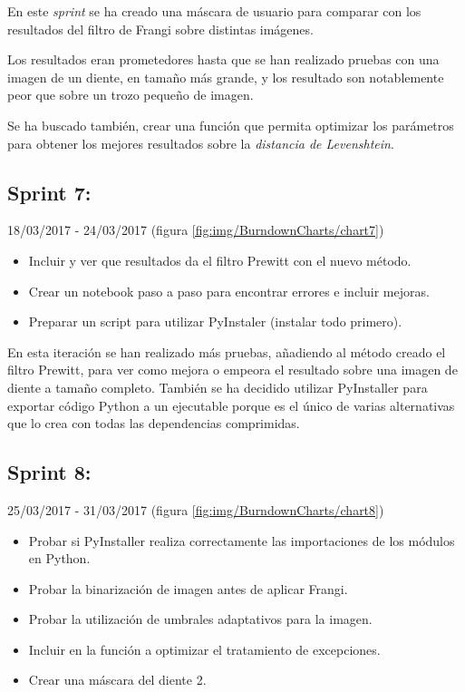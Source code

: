 En este \textit{sprint} se ha creado una máscara de usuario para comparar con los resultados del filtro de Frangi sobre distintas imágenes. 

Los resultados eran prometedores hasta que se han realizado pruebas con una imagen de un diente, en tamaño más grande, y los resultado son notablemente peor que sobre un trozo pequeño de imagen.

Se ha buscado también, crear una función que permita optimizar los parámetros para obtener los mejores resultados sobre la \textit{distancia de Levenshtein}.

\newpage

\subsection{Sprint 7:}
18/03/2017 - 24/03/2017 (figura \ref{fig:img/BurndownCharts/chart7})


\begin{itemize}
    \item Incluir y ver que resultados da el filtro Prewitt con el nuevo método.
    \item Crear un notebook paso a paso para encontrar errores e incluir mejoras.
    \item Preparar un script para utilizar PyInstaler (instalar todo primero).
\end{itemize}

En esta iteración se han realizado más pruebas, añadiendo al método creado el filtro Prewitt, para ver como mejora o empeora el resultado sobre una imagen de diente a tamaño completo. También se ha decidido utilizar PyInstaller para exportar código Python a un ejecutable porque es el único de varias alternativas que lo crea con todas las dependencias comprimidas.

\newpage

\subsection{Sprint 8:}
25/03/2017 - 31/03/2017 (figura \ref{fig:img/BurndownCharts/chart8})


\begin{itemize}
    \item Probar si PyInstaller realiza correctamente las importaciones de los módulos en Python.
    \item Probar la binarización de imagen antes de aplicar Frangi.
    \item Probar la utilización de umbrales adaptativos para la imagen.
    \item Incluir en la función a optimizar el tratamiento de excepciones.
    \item Crear una máscara del diente 2.
\end{itemize}

